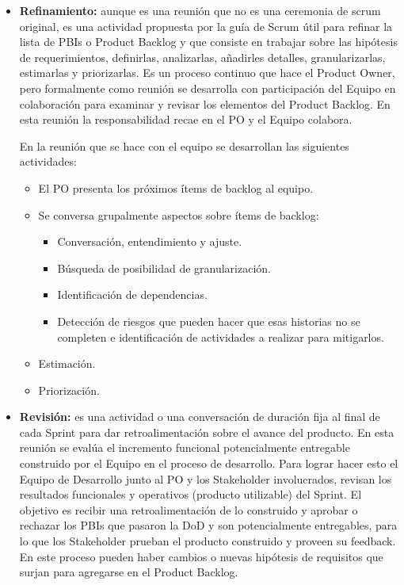 \begin{itemize}
\item \textbf{Refinamiento:} aunque es una reunión que no es una ceremonia de scrum original, es una actividad propuesta por la guía de Scrum útil para refinar la lista de PBIs o Product Backlog y que consiste en trabajar sobre las hipótesis de requerimientos, definirlas, analizarlas, añadirles detalles, granularizarlas, estimarlas y priorizarlas. Es un proceso continuo que hace el Product Owner, pero formalmente como reunión se desarrolla con participación del Equipo en colaboración para examinar y revisar los elementos del Product Backlog. En esta reunión la responsabilidad recae en el PO y el Equipo colabora.

En la reunión que se hace con el equipo se desarrollan las siguientes actividades:
  \begin{itemize}
  \item{El PO presenta los próximos ítems de backlog al equipo.}
  \item{Se conversa grupalmente aspectos sobre ítems de backlog: }
    \begin{itemize}
    \item{Conversación, entendimiento y ajuste.}
    \item{Búsqueda de posibilidad de granularización.}
    \item{Identificación de dependencias.}
    \item{Detección de riesgos que pueden hacer que esas historias no se completen e identificación de actividades a realizar para mitigarlos.}
    \end{itemize}
  \item{Estimación.}
  \item{Priorización.}
  \end{itemize}

\item \textbf{Revisión:} es una actividad o una conversación de duración fija al final de cada Sprint para dar retroalimentación sobre el avance del producto. En esta reunión se evalúa el incremento funcional potencialmente entregable construido por el Equipo en el proceso de desarrollo. Para lograr hacer esto el Equipo de Desarrollo junto al PO y los Stakeholder involucrados, revisan los resultados funcionales y operativos (producto utilizable) del Sprint. El objetivo es recibir una retroalimentación de lo construido y aprobar o rechazar los PBIs que pasaron la DoD y son potencialmente entregables, para lo que los Stakeholder prueban el producto construido y proveen su feedback. En este proceso pueden haber cambios o nuevas hipótesis de requisitos que surjan para agregarse en el Product Backlog.


\end{itemize}
